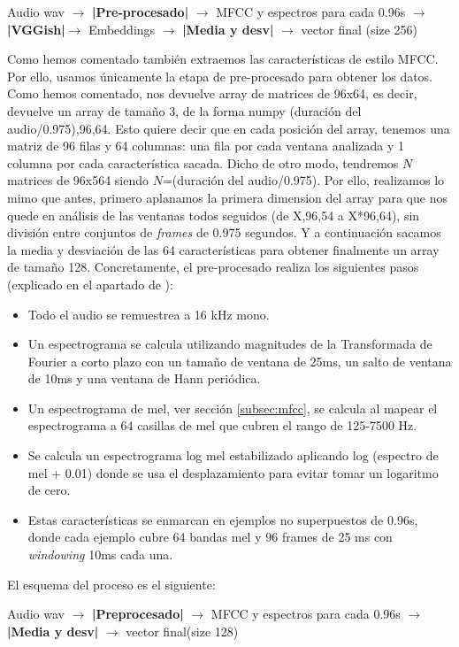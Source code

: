 Audio wav $\rightarrow$ \textbf{|Pre-procesado|} $\rightarrow$ MFCC y espectros para cada 0.96s $\rightarrow$ \textbf{|VGGish|}$\rightarrow$ Embeddings $\rightarrow$ \textbf{|Media y desv|} $\rightarrow$ vector final (size 256)

Como hemos comentado también extraemos las características de estilo MFCC. Por ello, usamos únicamente la etapa de pre-procesado para obtener los datos. Como hemos comentado, nos devuelve array de matrices de 96x64, es decir, devuelve un array  de tamaño 3, de la forma numpy (duración del audio/0.975),96,64. Esto quiere decir que en cada posición del array, tenemos una matriz de 96 filas y 64 columnas: una fila por cada ventana analizada y 1 columna por cada característica sacada. Dicho de otro modo, tendremos $N$ matrices de 96x564 siendo $N$=(duración del audio/0.975). Por ello, realizamos lo mimo que antes, primero aplanamos la primera dimension del array para que nos quede en análisis de las ventanas todos seguidos (de X,96,54 a X*96,64), sin división entre conjuntos de \textit{frames} de 0.975 segundos. Y a continuación sacamos la media y desviación de las 64 características para obtener finalmente un array de tamaño 128. Concretamente, el pre-procesado realiza los siguientes pasos (explicado en el apartado  de ):
\begin{itemize}
\item Todo el audio se remuestrea a 16 kHz mono.
\item Un espectrograma se calcula utilizando magnitudes de la Transformada de Fourier a corto plazo con un tamaño de ventana de 25ms, un salto de ventana de 10ms y una ventana de Hann periódica.
\item Un espectrograma de mel, ver sección \ref{subsec:mfcc}, se calcula al mapear el espectrograma a 64 casillas de mel que cubren el rango de 125-7500 Hz.
\item Se calcula un espectrograma log mel estabilizado aplicando log (espectro de mel + 0.01) donde se usa el desplazamiento para evitar tomar un logaritmo de cero.
\item Estas características se enmarcan en ejemplos no superpuestos de 0.96s, donde cada ejemplo cubre 64 bandas mel y 96 frames de 25 ms  con \textit{windowing} 10ms cada una.
\end{itemize}
El esquema del proceso es el siguiente:

Audio wav $\rightarrow$ \textbf{|Preprocesado|} $\rightarrow$ MFCC y espectros para cada 0.96s $\rightarrow$ \textbf{|Media y desv|} $\rightarrow$ vector final(size 128)

